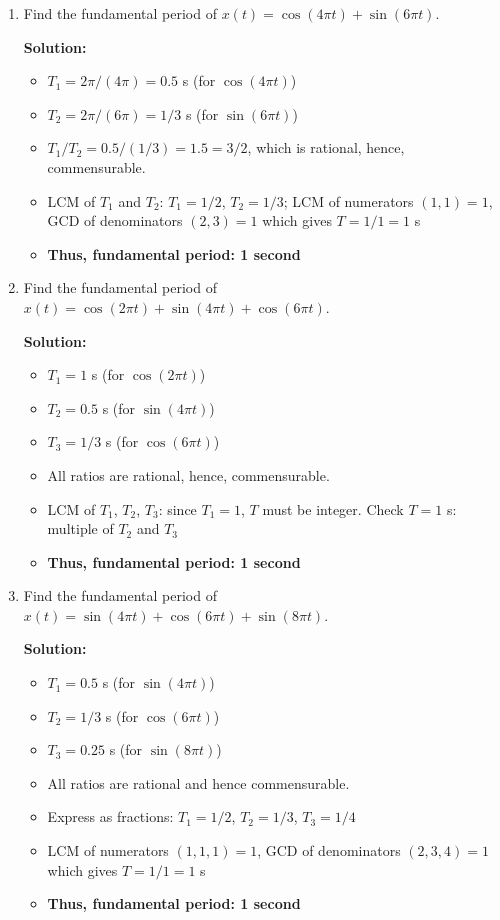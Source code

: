 \documentclass[nohyper,nobib,xcolor=dvipsnames,svgnames,x11names]{tufte-book}
\begin{document}
\begin{enumerate}




\item Find the fundamental period of $x(t) = \cos(4\pi t) + \sin(6\pi t)$.


\textbf{Solution:}
\begin{itemize}
    \item $ T_1 = 2\pi / (4\pi) = 0.5 $ s (for $\cos(4\pi t)$)
    \item $ T_2 = 2\pi / (6\pi) = 1/3 $ s (for $\sin(6\pi t)$)
    \item $ T_1 / T_2 = 0.5 / (1/3) = 1.5 = 3/2 $, which is rational, hence, commensurable.
    \item LCM of $ T_1 $ and $ T_2 $: $ T_1 = 1/2 $, $ T_2 = 1/3 $; LCM of numerators $(1,1) = 1$, GCD of denominators $(2,3) = 1$ which gives  $ T = 1/1 = 1 $ s
    \item \textbf{Thus, fundamental period: 1 second}
\end{itemize}
  
  
  \item Find the fundamental period of $x(t) = \cos(2\pi t) + \sin(4\pi t) + \cos(6\pi t) $.
  
\textbf{Solution:}
\begin{itemize}
    \item $T_1 = 1 $ s (for $\cos(2\pi t)$)
    \item $T_2 = 0.5 $ s (for $\sin(4\pi t)$)
    \item $T_3 = 1/3 $ s (for $\cos(6\pi t)$)
    \item All ratios are rational, hence, commensurable.
    \item LCM of $T_1 $, $T_2 $, $T_3 $: since $T_1 = 1 $, $T $ must be integer. Check $T = 1 $ s: multiple of $T_2 $ and $T_3 $
    \item \textbf{Thus, fundamental period: 1 second}
\end{itemize}


\item  Find the fundamental period of $x(t) = \sin(4\pi t) + \cos(6\pi t) + \sin(8\pi t) $. 

\textbf{Solution:}
\begin{itemize}
    \item $T_1 = 0.5 $ s (for $\sin(4\pi t)$)
    \item $T_2 = 1/3 $ s (for $\cos(6\pi t)$)
    \item $T_3 = 0.25 $ s (for $\sin(8\pi t)$)
    \item All ratios are rational and hence commensurable.
    \item Express as fractions: $T_1 = 1/2 $, $T_2 = 1/3 $, $T_3 = 1/4 $
    \item LCM of numerators $(1,1,1) = 1$, GCD of denominators $(2,3,4) = 1$ which gives $T = 1/1 = 1 $ s
    \item \textbf{Thus, fundamental period: 1 second}
\end{itemize}


\end{enumerate}
\end{document}
